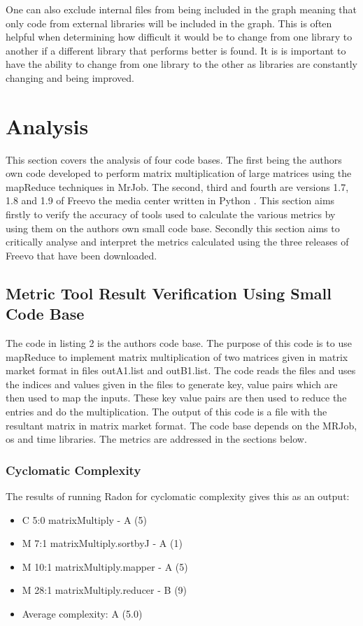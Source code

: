 \documentclass[10.5pt,journal, a4paper]{IEEEtran}
\begin{document}
\noindent
One can also exclude internal files from being included in the graph meaning that only code from external libraries will be included in the graph. This is often helpful when determining how difficult it would be to change from one library to another if a different library that performs better is found. It is is important to have the ability to change from one library to the other as libraries are constantly changing and being improved. 

\section{Analysis}
\noindent
This section covers the analysis of four code bases. The first being the authors own code developed to perform matrix multiplication of large matrices using the mapReduce techniques in MrJob. The second, third and fourth are versions 1.7, 1.8 and 1.9 of Freevo the media center written in Python \cite{Freevo}. This section aims firstly to verify the accuracy of tools used to calculate the various metrics by using them on the authors own small code base. Secondly this section aims to critically analyse and interpret the metrics calculated using the three releases of Freevo that have been downloaded. 

\subsection{Metric Tool Result Verification Using Small Code Base}
\noindent
The code in listing 2 is the authors code base. The purpose of this code is to use mapReduce to implement matrix multiplication of two matrices given in matrix market format in files outA1.list and outB1.list. The code reads the files and uses the indices and values given in the files to generate key, value pairs which are then used to map the inputs. These key value pairs are then used to reduce the entries and do the multiplication. The output of this code is a file with the resultant matrix in matrix market format. The code base depends on the MRJob, os and time libraries. The metrics are addressed in the sections below. 

\subsubsection{Cyclomatic Complexity}
\noindent
The results of running Radon for cyclomatic complexity gives this as an output:
\begin{itemize}
\item C 5:0 matrixMultiply - A (5)
\item M 7:1 matrixMultiply.sortbyJ - A (1)
\item M 10:1 matrixMultiply.mapper - A (5)
\item M 28:1 matrixMultiply.reducer - B (9)
\item Average complexity: A (5.0)
\end{itemize}
\end{document}
